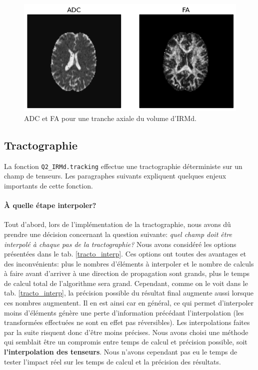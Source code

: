 \documentclass[a4paper]{article}
\begin{document}
\begin{figure}
\begin{center}
\includegraphics[scale=0.9]{adc_fa}
\caption{ADC et FA pour une tranche axiale du volume d'IRMd.\label{adc_fa}}
\end{center}
\end{figure}

\subsection{Tractographie}
La fonction \lstinline{Q2_IRMd.tracking} effectue une tractographie déterministe sur un champ de tenseurs. Les paragraphes suivants expliquent quelques enjeux importants de cette fonction.

\paragraph{À quelle étape interpoler?} Tout d'abord, lors de l'implémentation de la tractographie, nous avons dû prendre une décision concernant la question suivante: \textit{quel champ doit être interpolé à chaque pas de la tractographie?} Nous avons considéré les options présentées dans le tab. \ref{tracto_interp}. Ces options ont toutes des avantages et des inconvénients: plus le nombres d'éléments à interpoler et le nombre de calculs à faire avant d'arriver à une direction de propagation sont grands, plus le temps de calcul total de l'algorithme sera grand. Cependant, comme on le voit dans le tab. \ref{tracto_interp}, la précision possible du résultat final augmente aussi lorsque ces nombres augmentent. Il en est ainsi car en général, ce qui permet d'interpoler moins d'éléments génère une perte d'information précédant l'interpolation (les transformées effectuées ne sont en effet pas réversibles). Les interpolations faites par la suite risquent donc d'être moins précises. Nous avons choisi une méthode qui semblait être un compromis entre temps de calcul et précision possible, soit \textbf{l'interpolation des tenseurs}. Nous n'avons cependant pas eu le temps de tester l'impact réel sur les temps de calcul et la précision des résultats.
\end{document}
